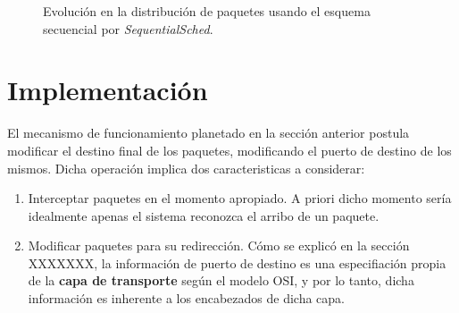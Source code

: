 \begin{figure}[th!]
\centering
{}
\caption{Evolución en la distribución de paquetes usando el esquema secuencial por \emph{SequentialSched}.}
\label{fig:SequentialSched}
\end{figure}

\section{Implementación}
El mecanismo de funcionamiento planetado en la sección anterior postula modificar el destino final de los paquetes, modificando el puerto de destino de los mismos. Dicha operación implica dos caracteristicas a considerar:

\begin{enumerate}
\item Interceptar paquetes en el momento apropiado. A priori dicho momento sería idealmente apenas el sistema reconozca el arribo de un paquete.
\item Modificar paquetes para su redirección. Cómo se explicó en la sección XXXXXXX, la información de puerto de destino es una especifiación propia de la \textbf{capa de transporte} según el modelo OSI, y por lo tanto, dicha información es inherente a los encabezados de dicha capa.
\end{enumerate}

